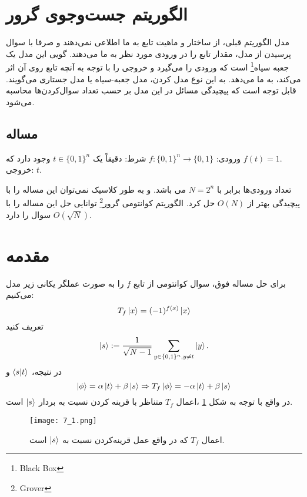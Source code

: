    \section{الگوریتم جست‌وجوی گرور}
   مدل الگوریتم قبلی، از ساختار و ماهیت تابع به ما اطلاعی نمی‌دهند و صرفا با سوال پرسیدن از مدل، مقدار تابع را در ورودی مورد نظر به ما می‌دهند. گویی این مدل یک جعبه سیاه\footnote{Black Box} است که ورودی را می‌گیرد و   خروجی را با توجه به آنچه تابع روی آن اثر می‌کند، به ما می‌دهد. به این نوع مدل کردن، مدل جعبه-سیاه یا مدل جستاری می‌گویند. قابل توجه است که پیچیدگی مسائل در این مدل بر حسب تعداد سوال‌کردن‌ها محاسبه می‌شود. 
   
   \subsection{مساله}
   ورودی:
    $f: \{0,1\}^{n} \to \{0,1\}$
شرط: دقیقاً یک 
$t \in \{0,1\}^{n}$
وجود دارد که 
$f(t) = 1$.
\\ خروجی: $t$.

تعداد ورودی‌ها برابر با 
$N = 2^{n}$
می باشد. و به طور کلاسیک نمی‌توان این مساله را با پیچیدگی بهتر از 
$O(N)$
 حل کرد. الگوریتم کوانتومی گرور\footnote{Grover} توانایی حل این مساله را با
 $O(\sqrt{N})$
 سوال را دارد.
 \section{مقدمه}
 برای حل مساله فوق، سوال کوانتومی از تابع $f$ را به صورت عملگر یکانی زیر مدل می‌کنیم:
 \begin{equation}
 	T_{f}\ket{x} = (-1)^{f(x)}\ket{x}
 \end{equation}
 تعریف کنید 
 \begin{equation}
 	\ket{s} := \frac{1}{\sqrt{N - 1}} \sum_{y \in \{0,1\}^{n}, y \ne t} \ket{y}.
 \end{equation}
در نتیجه، 
$\braket{s}{t}$
و
\begin{equation}
	\ket{\phi} = \alpha\ket{t} + \beta\ket{s} \Rightarrow T_{f}\ket{\phi} = -\alpha\ket{t} + \beta\ket{s}
\end{equation}
در واقع با توجه به شکل \ref{fig:7-1} ،اعمال $T_{f}$ متناظر با قرینه کردن نسبت به بردار $\ket{s}$ است. 
\begin{figure}[h]
	\caption{ اعمال $T_{f}$ که در واقع عمل قرینه‌کردن نسبت به $\ket{s}$ است.}
	\centering
	\texttt{[image: 7\_1.png]}
	\label{fig:7-1}
\end{figure}
 
